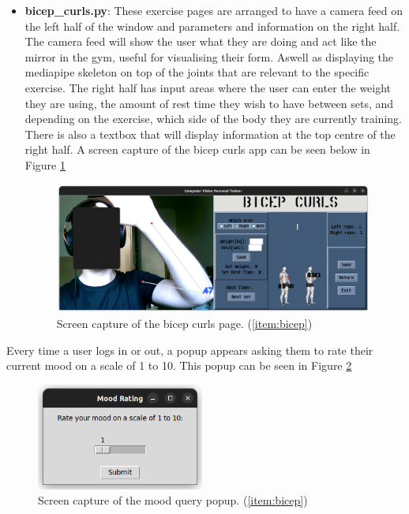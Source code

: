 \begin{itemize}
            \item \textbf{bicep\_curls.py}\label{item:bicep}: These exercise pages are arranged to have a camera feed on the left half of the window and parameters and information on the right half. The camera feed will show the user what they are doing and act like the mirror in the gym, useful for visualising their form. Aswell as displaying the mediapipe skeleton on top of the joints that are relevant to the specific exercise. The right half has input areas where the user can enter the weight they are using, the amount of rest time they wish to have between sets, and depending on the exercise, which side of the body they are currently training. There is also a textbox that will display information at the top centre of the right half. A screen capture of the bicep curls app can be seen below in Figure \ref{fig:bicep}
            \begin{figure}[htbp]
                    \centering
                    \includegraphics[width=0.99\textwidth]{figures/biceps.png}
                    \caption{Screen capture of the bicep curls page. (\ref{item:bicep})}
                    \label{fig:bicep}
            \end{figure}
        \end{itemize}

    Every time a user logs in or out, a popup appears asking them to rate their current mood on a scale of 1 to 10. This popup can be seen in Figure \ref{fig:mood}
    \begin{figure}[htbp]
            \centering
            \includegraphics[width=0.49\textwidth]{figures/mood.png}
            \caption{Screen capture of the mood query popup. (\ref{item:bicep})}
            \label{fig:mood}
    \end{figure}
    
